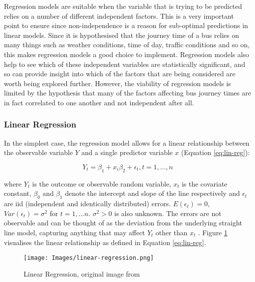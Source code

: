 Regression models are suitable when the variable that is trying to be predicted relies on a number of different independent factors. This is a very important point to ensure since non-independence is a reason for sub-optimal predictions in linear models. Since it is hypothesised that the journey time of a bus relies on many things such as weather conditions, time of day, traffic conditions and so on, this makes regression models a good choice to implement. Regression models also help to see which of these independent variables are statistically significant, and so can provide insight into which of the factors that are being considered are worth being explored further. However, the viability of regression models is limited by the hypothesis that many of the factors affecting bus journey times are in fact correlated to one another and not independent after all. 

\subsubsection{Linear Regression}

In the simplest case, the regression model allows for a linear relationship between the observable variable $Y$ and a single predictor variable $x$ (Equation \ref{eq:lin-reg}): 

\begin{equation}
    Y_t = \beta_1 + x_i\beta_2 + \epsilon_t, t = 1, ..., n
    \label{eq:lin-reg}
\end{equation}

where $Y_t$ is the outcome or observable random variable, $x_t$ is the covariate constant, $\beta_0$ and $\beta_1$ denote the intercept and slope of the line respectively and $\epsilon_t$ are iid (independent and identically distributed) errors. $E(\epsilon_t) = 0$, $Var(\epsilon_t) = \sigma^2$ for $t = 1,...n$. $\sigma^2 > 0$ is also unknown. The errors are not observable and can be thought of as the deviation from the underlying straight line model, capturing anything that may affect $Y_t$ other than $x_t$ \cite{forecasting-book}. Figure \ref{fig:lin-reg} visualises the linear relationship as defined in Equation \ref{eq:lin-reg}.

\begin{figure}[H]
\begin{center}
    \texttt{[image: Images/linear-regression.png]}
    \caption{Linear Regression, original image from \cite{forecasting-book}}
    \label{fig:lin-reg}
\end{center}
\end{figure}

